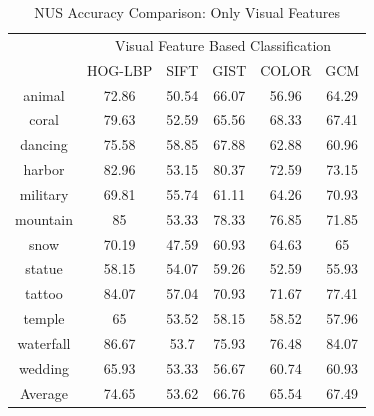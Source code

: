 \begin{table}
\centering
\caption{ NUS Accuracy Comparison: Only Visual Features} %
\vspace*{0.2 cm}
\begin{tabular}{| c | c | c | c | c | c |}
\hline
 {\multirow{2}{*}{Labels}} & \multicolumn{5}{|c|}{Visual Feature Based Classification} \\ 
 \cline{2-6}
  & HOG-LBP & SIFT & GIST & COLOR & GCM \\  [1ex] \hline
animal & 72.86 & 50.54 & 66.07 & 56.96 & 64.29 \\  [1ex] \hline
coral & 79.63 & 52.59 & 65.56 & 68.33 & 67.41 \\  [1ex] \hline
dancing & 75.58 & 58.85 & 67.88 & 62.88 & 60.96 \\  [1ex] \hline
harbor & 82.96 & 53.15 & 80.37 & 72.59 & 73.15 \\  [1ex] \hline
military & 69.81 & 55.74 & 61.11 & 64.26 & 70.93 \\  [1ex] \hline
mountain & 85 & 53.33 & 78.33 & 76.85 & 71.85 \\  [1ex] \hline
snow & 70.19 & 47.59 & 60.93 & 64.63 & 65 \\  [1ex] \hline
statue & 58.15 & 54.07 & 59.26 & 52.59 & 55.93 \\  [1ex] \hline
tattoo & 84.07 & 57.04 & 70.93 & 71.67 & 77.41 \\  [1ex] \hline
temple & 65 & 53.52 & 58.15 & 58.52 & 57.96 \\  [1ex] \hline
waterfall & 86.67 & 53.7 & 75.93 & 76.48 & 84.07 \\  [1ex] \hline
wedding & 65.93 & 53.33 & 56.67 & 60.74 & 60.93 \\  [1ex] \hline
Average & 74.65 & 53.62 & 66.76 & 65.54 & 67.49 \\  [1ex] \hline
\end{tabular}
\label{NUSAccuracyVisual} %
\end{table}

